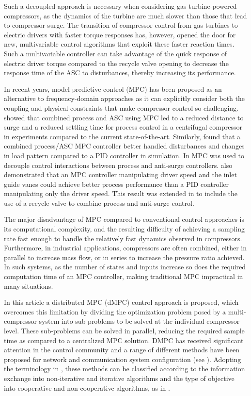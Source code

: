 Such a decoupled approach is necessary when considering gas turbine-powered compressors, as the dynamics of the turbine are much slower than those that lead to compressor surge.
The transition of compressor control from gas turbines to electric drivers with faster torque responses has, however, opened the door for new, multivariable control algorithms that exploit these faster reaction times.
Such a multivariable controller can take advantage of the quick response of electric driver torque compared to the recycle valve opening to decrease the response time of the ASC to disturbances, thereby increasing its performance.

In recent years, model predictive control (MPC) has been proposed as an alternative to frequency-domain approaches as it can explicitly consider both the coupling and physical constraints that make compressor control so challenging.
\cite{Cortinovis2015} showed that combined process and ASC using MPC led to a reduced distance to surge and a reduced settling time for process control in a centrifugal compressor in experiments compared to the current state-of-the-art.
Similarly, \cite{Budinis2015} found that a combined process/ASC MPC controller better handled disturbances and changes in load pattern compared to a PID controller in simulation.
In \cite{Mercangoz2016} MPC was used to decouple control interactions between process and anti-surge controllers.
\cite{Bentaleb2014} also demonstrated that an MPC controller manipulating driver speed and the inlet guide vanes could achieve better process performance than a PID controller manipulating only the driver speed.
This result was extended in \cite{Bentaleb2015} to include the use of a recycle valve to combine process and anti-surge control.

The major disadvantage of MPC compared to conventional control approaches is its computational complexity, and the resulting difficulty of achieving a sampling rate fast enough to handle the relatively fast dynamics observed in compressors.
Furthermore, in industrial applications, compressors are often combined, either in parallel to increase mass flow, or in series to increase the pressure ratio achieved.
In such systems, as the number of states and inputs increase so does the required computation time of an MPC controller, making traditional MPC impractical in many situations.

In this article a distributed MPC (dMPC) control approach is proposed, which overcomes this limitation by dividing the optimization problem posed by a multi-compressor system into sub-problems to be solved at the individual compressor level.
These sub-problems can be solved in parallel, reducing the required sample time as compared to a centralized MPC solution.
DMPC has received significant attention in the control community and a range of different methods have been proposed for network and communication system configuration (see \cite{Camponogara2002, Venkat2007}).
Adopting the terminology in \cite{Scattolini2009}, these methods can be classified according to the information exchange into non-iterative and iterative algorithms and the type of objective into cooperative and non-cooperative algorithms, as in \cite{Zeilinger2013}.

